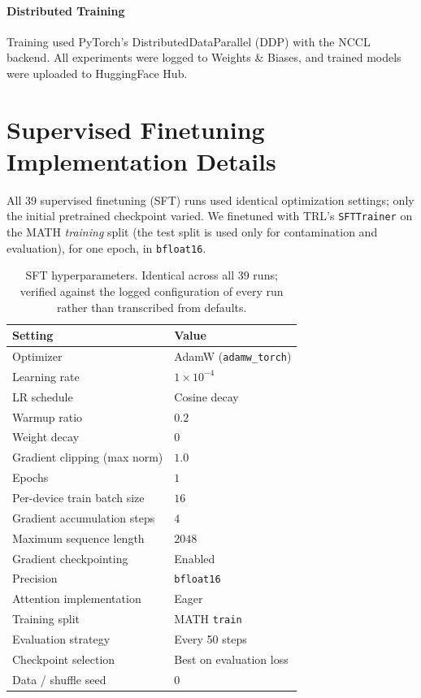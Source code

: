 \paragraph{Distributed Training}
Training used PyTorch's DistributedDataParallel (DDP) with the NCCL backend.
All experiments were logged to Weights \& Biases, and trained models were uploaded to HuggingFace Hub.

\section{Supervised Finetuning Implementation Details}
\label{app:sec:sft_implementation_details}

All 39 supervised finetuning (SFT) runs used identical optimization settings; only the initial pretrained checkpoint varied.
We finetuned with TRL's \texttt{SFTTrainer} on the MATH \emph{training} split (the test split is used only for contamination and evaluation), for one epoch, in \texttt{bfloat16}.

\begin{table}[h]
\centering
\caption{SFT hyperparameters. Identical across all 39 runs; verified against the logged configuration of every run rather than transcribed from defaults.}
\label{app:tab:sft_hyperparameters}
\begin{tabular}{ll}
\toprule
Setting & Value \\
\midrule
Optimizer & AdamW (\texttt{adamw\_torch}) \\
Learning rate & $1 \times 10^{-4}$ \\
LR schedule & Cosine decay \\
Warmup ratio & $0.2$ \\
Weight decay & $0$ \\
Gradient clipping (max norm) & $1.0$ \\
Epochs & $1$ \\
Per-device train batch size & $16$ \\
Gradient accumulation steps & $4$ \\
Maximum sequence length & $2048$ \\
Gradient checkpointing & Enabled \\
Precision & \texttt{bfloat16} \\
Attention implementation & Eager \\
Training split & MATH \texttt{train} \\
Evaluation strategy & Every 50 steps \\
Checkpoint selection & Best on evaluation loss \\
Data / shuffle seed & $0$ \\
\bottomrule
\end{tabular}
\end{table}


